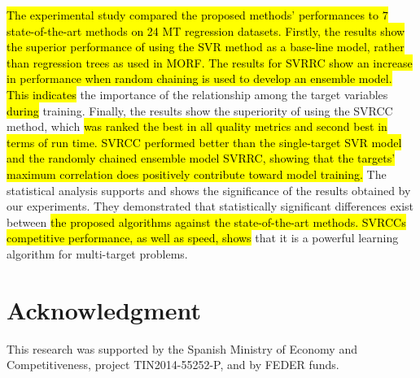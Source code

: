 \documentclass[preprint,12pt]{elsarticle}
\begin{document}
\hl{The experimental study compared the proposed methods' performances to $7$ state-of-the-art methods on 24 MT regression datasets. Firstly, the results show the superior performance of using the SVR method as a base-line model, rather than regression trees as used in MORF. The results for SVRRC show an increase in performance when random chaining is used to develop an ensemble model. This indicates} the importance of the relationship among the target variables \hl{during} training. Finally, the results show the superiority of using the SVRCC method, which \hl{was ranked the best in all quality metrics and second best in terms of run time. SVRCC performed better than the single-target SVR model and the randomly chained ensemble model SVRRC, showing that the targets' maximum correlation does positively contribute toward model training.} The statistical analysis supports and shows the significance of the results obtained by our experiments. They demonstrated that statistically significant differences exist between \hl{the proposed algorithms against the state-of-the-art methods. SVRCCs competitive performance, as well as speed, shows} that it is a powerful learning algorithm for multi-target problems. 

\section*{Acknowledgment}

This research was supported by the Spanish Ministry of Economy and Competitiveness, project TIN2014-55252-P, and by FEDER funds.



\end{document}
